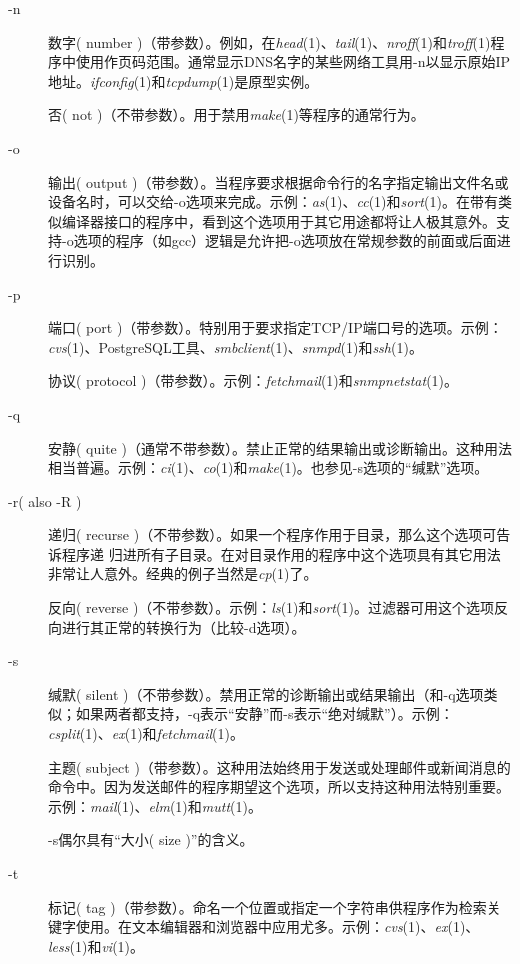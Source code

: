 \documentclass[12pt,oneside]{book}
\begin{document}
\begin{common-format}
\begin{description}
\item[-n] 数字( number )（带参数）。例如，在\textit{head}(1)、\textit{tail}(1)、\textit{nroff}(1)和\textit{troff}(1)程序中使用作页码范围。通常显示DNS名字的某些网络工具用-n以显示原始IP地址。\textit{ifconfig}(1)和\textit{tcpdump}(1)是原型实例。

否( not )（不带参数）。用于禁用\textit{make}(1)等程序的通常行为。

\item[-o] 输出( output )（带参数）。当程序要求根据命令行的名字指定输出文件名或设备名时，可以交给-o选项来完成。示例：\textit{as}(1)、\textit{cc}(1)和\textit{sort}(1)。在带有类似编译器接口的程序中，看到这个选项用于其它用途都将让人极其意外。支持-o选项的程序（如gcc）逻辑是允许把-o选项放在常规参数的前面或后面进行识别。

\item[-p] 端口( port )（带参数）。特别用于要求指定TCP/IP端口号的选项。示例：\textit{cvs}(1)、PostgreSQL工具、\textit{smbclient}(1)、\textit{snmpd}(1)和\textit{ssh}(1)。

协议( protocol )（带参数）。示例：\textit{fetchmail}(1)和\textit{snmpnetstat}(1)。

\item[-q] 安静( quite )（通常不带参数）。禁止正常的结果输出或诊断输出。这种用法相当普遍。示例：\textit{ci}(1)、\textit{co}(1)和\textit{make}(1)。也参见-s选项的“缄默”选项。

\item[-r( also -R )] 递归( recurse )（不带参数）。如果一个程序作用于目录，那么这个选项可告诉程序递
归进所有子目录。在对目录作用的程序中这个选项具有其它用法非常让人意外。经典的例子当然是\textit{cp}(1)了。

反向( reverse )（不带参数）。示例：\textit{ls}(1)和\textit{sort}(1)。过滤器可用这个选项反向进行其正常的转换行为（比较-d选项）。

\item[-s] 缄默( silent )（不带参数）。禁用正常的诊断输出或结果输出（和-q选项类似；如果两者都支持，-q表示“安静”而-s表示“绝对缄默”）。示例：\textit{csplit}(1)、\textit{ex}(1)和\textit{fetchmail}(1)。

主题( subject )（带参数）。这种用法始终用于发送或处理邮件或新闻消息的命令中。因为发送邮件的程序期望这个选项，所以支持这种用法特别重要。示例：\textit{mail}(1)、\textit{elm}(1)和\textit{mutt}(1)。

-s偶尔具有“大小( size )”的含义。

\item[-t] 标记( tag )（带参数）。命名一个位置或指定一个字符串供程序作为检索关键字使用。在文本编辑器和浏览器中应用尤多。示例：\textit{cvs}(1)、\textit{ex}(1)、\textit{less}(1)和\textit{vi}(1)。


\end{description}
\end{common-format}
\end{document}
